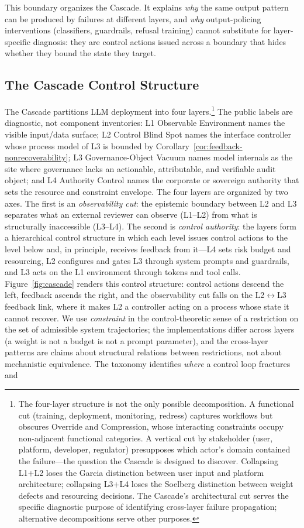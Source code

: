This boundary organizes the Cascade. It explains \textit{why} the same output pattern can be produced by failures at different layers, and \textit{why} output-policing interventions (classifiers, guardrails, refusal training) cannot substitute for layer-specific diagnosis: they are control actions issued across a boundary that hides whether they bound the state they target.

\subsection{The Cascade Control Structure}

The Cascade partitions LLM deployment into four layers.\footnote{The four-layer structure is not the only possible decomposition. A functional cut (training, deployment, monitoring, redress) captures workflows but obscures Override and Compression, whose interacting constraints occupy non-adjacent functional categories. A vertical cut by stakeholder (user, platform, developer, regulator) presupposes which actor's domain contained the failure---the question the Cascade is designed to discover. Collapsing L1+L2 loses the Garcia distinction between user input and platform architecture; collapsing L3+L4 loses the Soelberg distinction between weight defects and resourcing decisions. The Cascade's architectural cut serves the specific diagnostic purpose of identifying cross-layer failure propagation; alternative decompositions serve other purposes.} The public labels are diagnostic, not component inventories: L1 Observable Environment names the visible input/data surface; L2 Control Blind Spot names the interface controller whose process model of L3 is bounded by Corollary~\ref{cor:feedback-nonrecoverability}; L3 Governance-Object Vacuum names model internals as the site where governance lacks an actionable, attributable, and verifiable audit object; and L4 Authority Control names the corporate or sovereign authority that sets the resource and constraint envelope. The four layers are organized by two axes. The first is an \emph{observability cut}: the epistemic boundary between L2 and L3 separates what an external reviewer can observe (L1--L2) from what is structurally inaccessible (L3--L4). The second is \emph{control authority}: the layers form a hierarchical control structure in which each level issues control actions to the level below and, in principle, receives feedback from it---L4 sets risk budget and resourcing, L2 configures and gates L3 through system prompts and guardrails, and L3 acts on the L1 environment through tokens and tool calls. Figure~\ref{fig:cascade} renders this control structure: control actions descend the left, feedback ascends the right, and the observability cut falls on the L2$\leftrightarrow$L3 feedback link, where it makes L2 a controller acting on a process whose state it cannot recover. We use \textit{constraint} in the control-theoretic sense of a restriction on the set of admissible system trajectories; the implementations differ across layers (a weight is not a budget is not a prompt parameter), and the cross-layer patterns are claims about structural relations between restrictions, not about mechanistic equivalence. The taxonomy identifies \textit{where} a control loop fractures and 